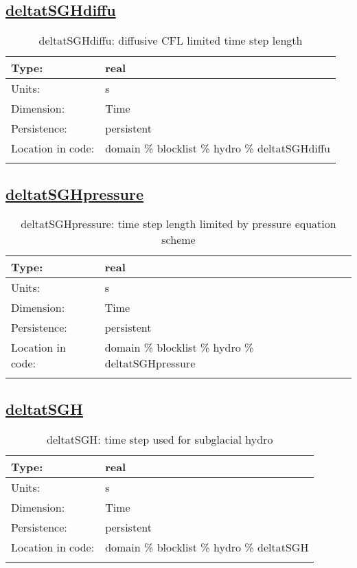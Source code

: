 \subsection[deltatSGHdiffu]{\hyperref[sec:var_tab_hydro]{deltatSGHdiffu}}
\label{subsec:var_sec_hydro_deltatSGHdiffu}
\begin{center}
\begin{longtable}{| p{2.0in} | p{4.0in} |}
        \hline 
        Type: & real \\
        \hline 
        Units: & \si{s} \\
        \hline 
        Dimension: & Time \\
        \hline 
        Persistence: & persistent \\
        \hline 
         Location in code: & domain \% blocklist \% hydro \% deltatSGHdiffu \\
         \hline 
    \caption{deltatSGHdiffu: diffusive CFL limited time step length}
\end{longtable}
\end{center}
\subsection[deltatSGHpressure]{\hyperref[sec:var_tab_hydro]{deltatSGHpressure}}
\label{subsec:var_sec_hydro_deltatSGHpressure}
\begin{center}
\begin{longtable}{| p{2.0in} | p{4.0in} |}
        \hline 
        Type: & real \\
        \hline 
        Units: & \si{s} \\
        \hline 
        Dimension: & Time \\
        \hline 
        Persistence: & persistent \\
        \hline 
         Location in code: & domain \% blocklist \% hydro \% deltatSGHpressure \\
         \hline 
    \caption{deltatSGHpressure: time step length limited by pressure equation scheme}
\end{longtable}
\end{center}
\subsection[deltatSGH]{\hyperref[sec:var_tab_hydro]{deltatSGH}}
\label{subsec:var_sec_hydro_deltatSGH}
\begin{center}
\begin{longtable}{| p{2.0in} | p{4.0in} |}
        \hline 
        Type: & real \\
        \hline 
        Units: & \si{s} \\
        \hline 
        Dimension: & Time \\
        \hline 
        Persistence: & persistent \\
        \hline 
         Location in code: & domain \% blocklist \% hydro \% deltatSGH \\
         \hline 
    \caption{deltatSGH: time step used for subglacial hydro}
\end{longtable}
\end{center}

